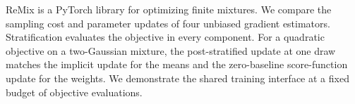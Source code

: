 ReMix is a PyTorch library for optimizing finite mixtures. We compare the
sampling cost and parameter updates of four unbiased gradient estimators.
Stratification evaluates the objective in every component. For a quadratic
objective on a two-Gaussian mixture, the post-stratified update at one draw
matches the implicit update for the means and the zero-baseline score-function
update for the weights. We demonstrate the shared training interface at a
fixed budget of objective evaluations.
